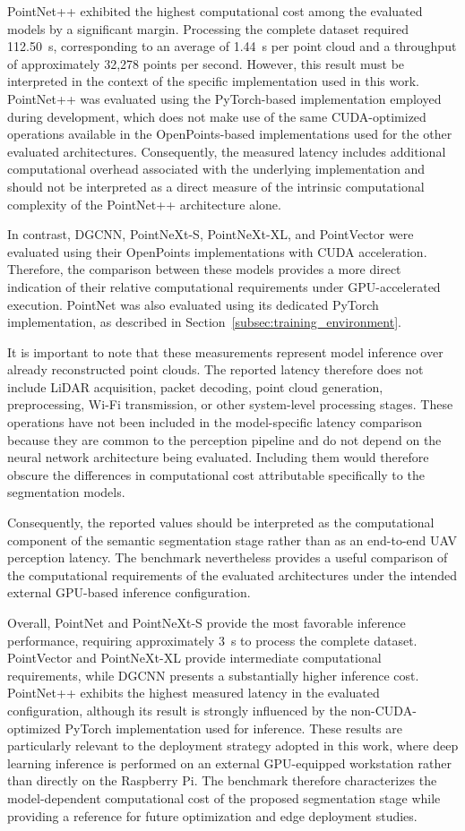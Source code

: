 PointNet++ exhibited the highest computational cost among the evaluated models by a significant margin. Processing the complete dataset required 112.50~s, corresponding to an average of 1.44~s per point cloud and a throughput of approximately 32,278 points per second. However, this result must be interpreted in the context of the specific implementation used in this work. PointNet++ was evaluated using the PyTorch-based implementation employed during development, which does not make use of the same CUDA-optimized operations available in the OpenPoints-based implementations used for the other evaluated architectures. Consequently, the measured latency includes additional computational overhead associated with the underlying implementation and should not be interpreted as a direct measure of the intrinsic computational complexity of the PointNet++ architecture alone.

In contrast, DGCNN, PointNeXt-S, PointNeXt-XL, and PointVector were evaluated using their OpenPoints implementations with CUDA acceleration. Therefore, the comparison between these models provides a more direct indication of their relative computational requirements under GPU-accelerated execution. PointNet was also evaluated using its dedicated PyTorch implementation, as described in Section~\ref{subsec:training_environment}.

It is important to note that these measurements represent model inference over already reconstructed point clouds. The reported latency therefore does not include LiDAR acquisition, packet decoding, point cloud generation, preprocessing, Wi-Fi transmission, or other system-level processing stages. These operations have not been included in the model-specific latency comparison because they are common to the perception pipeline and do not depend on the neural network architecture being evaluated. Including them would therefore obscure the differences in computational cost attributable specifically to the segmentation models.

Consequently, the reported values should be interpreted as the computational component of the semantic segmentation stage rather than as an end-to-end UAV perception latency. The benchmark nevertheless provides a useful comparison of the computational requirements of the evaluated architectures under the intended external GPU-based inference configuration.

Overall, PointNet and PointNeXt-S provide the most favorable inference performance, requiring approximately 3~s to process the complete dataset. PointVector and PointNeXt-XL provide intermediate computational requirements, while DGCNN presents a substantially higher inference cost. PointNet++ exhibits the highest measured latency in the evaluated configuration, although its result is strongly influenced by the non-CUDA-optimized PyTorch implementation used for inference. These results are particularly relevant to the deployment strategy adopted in this work, where deep learning inference is performed on an external GPU-equipped workstation rather than directly on the Raspberry Pi. The benchmark therefore characterizes the model-dependent computational cost of the proposed segmentation stage while providing a reference for future optimization and edge deployment studies.


